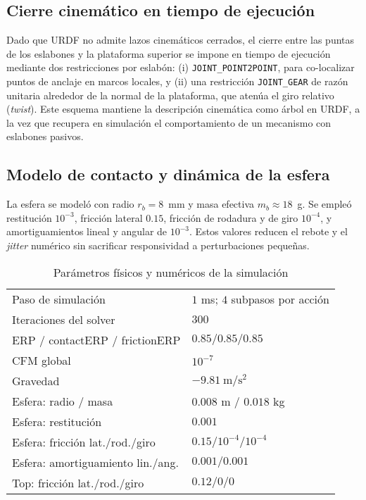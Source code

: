 \documentclass[conference]{IEEEtran}
\begin{document}
\subsection{Cierre cinemático en tiempo de ejecución}
Dado que URDF no admite lazos cinemáticos cerrados, el cierre entre las puntas de los eslabones y la plataforma superior se impone en tiempo de ejecución mediante dos restricciones por eslabón: (i) \texttt{JOINT\_POINT2POINT}, para co-localizar puntos de anclaje en marcos locales, y (ii) una restricción \texttt{JOINT\_GEAR} de razón unitaria alrededor de la normal de la plataforma, que atenúa el giro relativo (\emph{twist}). Este esquema mantiene la descripción cinemática como árbol en URDF, a la vez que recupera en simulación el comportamiento de un mecanismo con eslabones pasivos.

\subsection{Modelo de contacto y dinámica de la esfera}
La esfera se modeló con radio $r_b=8$~mm y masa efectiva $m_b\approx 18$~g. Se empleó restitución $10^{-3}$, fricción lateral $0.15$, fricción de rodadura y de giro $10^{-4}$, y amortiguamientos lineal y angular de $10^{-3}$. Estos valores reducen el rebote y el \emph{jitter} numérico sin sacrificar responsividad a perturbaciones pequeñas.

\begin{table}[th]
\centering
\caption{Parámetros físicos y numéricos de la simulación}
\label{tab:sim-params}
\renewcommand{\arraystretch}{1.1}
\begin{tabular}{ll}
\hline
Paso de simulación & $1$ ms; $4$ subpasos por acción \\
Iteraciones del solver & $300$ \\
ERP / contactERP / frictionERP & $0.85 / 0.85 / 0.85$ \\
CFM global & $10^{-7}$ \\
Gravedad & $-9{.}81~\mathrm{m/s^2}$ \\
Esfera: radio / masa & $0.008$ m / $0.018$ kg \\
Esfera: restitución & $0.001$ \\
Esfera: fricción lat./rod./giro & $0.15 / 10^{-4} / 10^{-4}$ \\
Esfera: amortiguamiento lin./ang. & $0.001 / 0.001$ \\
Top: fricción lat./rod./giro & $0.12 / 0 / 0$ \\
\hline
\end{tabular}
\end{table}
\end{document}
